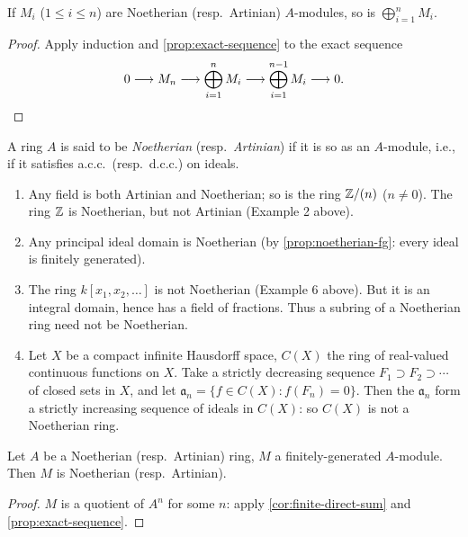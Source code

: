\begin{corollary}\label{cor:finite-direct-sum}
If $M_i$ ($1 \leq i \leq n$) are Noetherian (resp.\ Artinian) $A$-modules, so is $\bigoplus_{i=1}^n M_i$.
\end{corollary}

\begin{proof}
Apply induction and \eqref{prop:exact-sequence} to the exact sequence
\[
    0 \longrightarrow M_n \longrightarrow \bigoplus_{i=1}^n M_i \longrightarrow \bigoplus_{i=1}^{n-1} M_i \longrightarrow 0. \qedhere
\]
\end{proof}

A ring $A$ is said to be \emph{Noetherian} (resp.\ \emph{Artinian}) if it is so as an $A$-module, i.e., if it satisfies a.c.c.\ (resp.\ d.c.c.) on ideals.

\begin{examples}
\begin{enumerate}[1)]
    \item Any field is both Artinian and Noetherian; so is the ring $\mathbb{Z}/(n)$ ($n \neq 0$). The ring $\mathbb{Z}$ is Noetherian, but not Artinian (Example 2 above).
    
    \item Any principal ideal domain is Noetherian (by \eqref{prop:noetherian-fg}: every ideal is finitely generated).
    
    \item The ring $k[x_1, x_2, \ldots]$ is not Noetherian (Example 6 above). But it is an integral domain, hence has a field of fractions. Thus a subring of a Noetherian ring need not be Noetherian.
    
    \item Let $X$ be a compact infinite Hausdorff space, $C(X)$ the ring of real-valued continuous functions on $X$. Take a strictly decreasing sequence $F_1 \supset F_2 \supset \cdots$ of closed sets in $X$, and let $\mathfrak{a}_n = \{f \in C(X) : f(F_n) = 0\}$. Then the $\mathfrak{a}_n$ form a strictly increasing sequence of ideals in $C(X)$: so $C(X)$ is not a Noetherian ring.
\end{enumerate}
\end{examples}
\begin{proposition}\label{prop:fg-module}
    Let $A$ be a Noetherian (resp.\ Artinian) ring, $M$ a finitely-generated $A$-module. Then $M$ is Noetherian (resp.\ Artinian).
\end{proposition}
\begin{proof}
    $M$ is a quotient of $A^n$ for some $n$: apply \eqref{cor:finite-direct-sum} and \eqref{prop:exact-sequence}.
\end{proof}

